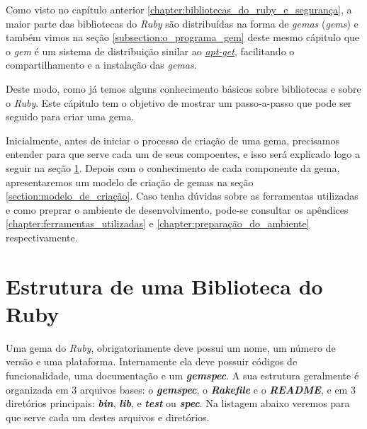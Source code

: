 Como visto no capítulo anterior \ref{chapter:bibliotecas_do_ruby_e_segurança}, a maior parte das bibliotecas do 
\emph{Ruby} são distribuídas na forma de \emph{gemas} (\emph{gems}) e também vimos na seção 
\ref{subsection:o_programa_gem} deste mesmo cápitulo que o \emph{gem} é um sistema de distribuição sinilar ao 
\emph{\href{https://packages.qa.debian.org/a/apt.html}{apt-get}}, facilitando o compartilhamento e a 
instalação das \emph{gemas}. 

Deste modo, como já temos alguns conhecimento básicos sobre bibliotecas e sobre o \emph{Ruby}. Este cápitulo
tem o objetivo de mostrar um passo-a-passo que pode ser seguido para criar uma gema.


Inicialmente, antes de iniciar o processo de criação de uma gema, precisamos entender para que serve cada um
de seus compoentes, e isso será explicado logo a seguir na seção \ref{section:estrutura_de_uma_biblioteca_do_ruby}.
Depois com o conhecimento de cada componente da gema, apresentaremos um modelo de criação de gemas
na seção \ref{section:modelo_de_criação}. Caso tenha dúvidas sobre as ferramentas utilizadas e como preprar
o ambiente de desenvolvimento, pode-se consultar os apêndices \ref{chapter:ferramentas_utilizadas} e
\ref{chapter:preparação_do_ambiente} respectivamente.

\section{Estrutura de uma Biblioteca do Ruby}
\label{section:estrutura_de_uma_biblioteca_do_ruby}

Uma gema do \emph{Ruby}, obrigatoriamente deve possui um nome, um número de versão e uma plataforma.
Internamente ela deve possuir códigos de funcionalidade, uma documentação e um \emph{\textbf{gemspec}}.
A sua estrutura geralmente é organizada em 3 arquivos bases: o \emph{\textbf{gemspec}}, o
\emph{\textbf{Rakefile}} e o \emph{\textbf{README}}, e em 3 diretórios principais: \emph{\textbf{bin}},
\emph{\textbf{lib}}, e \emph{\textbf{test}} ou \emph{\textbf{spec}}. Na listagem abaixo veremos para que
serve cada um destes arquivos e diretórios.

